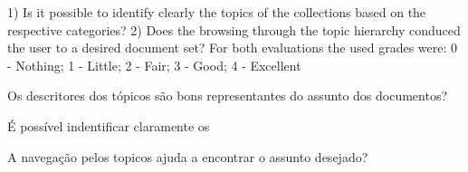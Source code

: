 1) Is it possible to identify clearly the topics of the collections
based on the respective categories?
2) Does the browsing through the topic hierarchy conduced
the user to a desired document set?
For both evaluations the used grades were:
0 - Nothing;
1 - Little;
2 - Fair;
3 - Good;
4 - Excellent


\item Os descritores dos tópicos são bons representantes do assunto dos documentos?
\item É possível indentificar claramente os 
\item A navegação pelos topicos ajuda a encontrar o assunto desejado?







